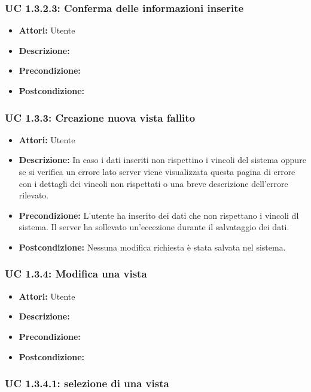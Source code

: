 \subsubsection{UC 1.3.2.3: Conferma delle informazioni inserite}

\begin{itemize}
\item \textbf{Attori:} Utente
\item \textbf{Descrizione:} 
\item \textbf{Precondizione:} 
\item \textbf{Postcondizione:} 
\end{itemize}

\subsubsection{UC 1.3.3: Creazione nuova vista fallito}

\begin{itemize}
\item \textbf{Attori:} Utente
\item \textbf{Descrizione:} In caso i dati inseriti non rispettino i vincoli del sistema oppure se si verifica un errore lato server viene visualizzata questa pagina di errore con i dettagli dei vincoli non rispettati o una breve descrizione dell'errore rilevato.
\item \textbf{Precondizione:} L'utente ha inserito dei dati che non rispettano i vincoli dl sistema.
Il server ha sollevato un'eccezione durante il salvataggio dei dati.
\item \textbf{Postcondizione:} Nessuna modifica richiesta è stata salvata nel sistema.
\end{itemize}

\subsubsection{UC 1.3.4: Modifica una vista}

\begin{itemize}
\item \textbf{Attori:} Utente
\item \textbf{Descrizione:} 
\item \textbf{Precondizione:} 
\item \textbf{Postcondizione:} 
\end{itemize}

\subsubsection{UC 1.3.4.1: selezione di una vista}

